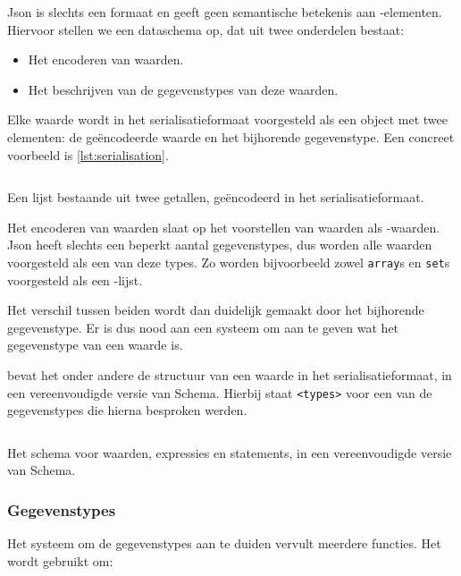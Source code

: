 Json is slechts een formaat en geeft geen semantische betekenis aan -elementen.
Hiervoor stellen we een dataschema op, dat uit twee onderdelen bestaat:

\begin{itemize}
    \item Het encoderen van waarden.
    \item Het beschrijven van de gegevenstypes van deze waarden.
\end{itemize}

Elke waarde wordt in het serialisatieformaat voorgesteld als een object met twee elementen: de geëncodeerde waarde en het bijhorende gegevenstype.
Een concreet voorbeeld is \cref{lst:serialisation}.

\begin{listing}
    \inputminted{json}{code/format.json}
    \caption{Een lijst bestaande uit twee getallen, geëncodeerd in het serialisatieformaat.}
    \label{lst:serialisation}
\end{listing}

Het encoderen van waarden slaat op het voorstellen van waarden als -waarden.
Json heeft slechts een beperkt aantal gegevenstypes, dus worden alle waarden voorgesteld als een van deze types.
Zo worden bijvoorbeeld zowel \texttt{array}s en \texttt{set}s voorgesteld als een -lijst.

Het verschil tussen beiden wordt dan duidelijk gemaakt door het bijhorende gegevenstype.
Er is dus nood aan een systeem om aan te geven wat het gegevenstype van een waarde is.

 bevat het onder andere de structuur van een waarde in het serialisatieformaat, in een vereenvoudigde versie van  Schema.
Hierbij staat \texttt{<types>} voor een van de gegevenstypes die hierna besproken werden.

\begin{listing}
    \inputminted{json}{code/type-schema.json}
    \caption{Het schema voor waarden, expressies en statements, in een vereenvoudigde versie van  Schema.}
    \label{lst:type-schema}
\end{listing}

\subsubsection{Gegevenstypes}

Het systeem om de gegevenstypes aan te duiden vervult meerdere functies.
Het wordt gebruikt om:

